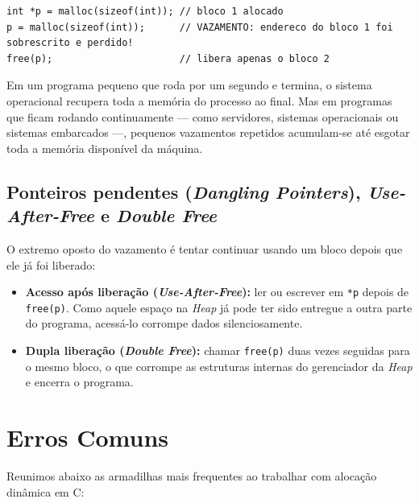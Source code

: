 \begin{lstlisting}
int *p = malloc(sizeof(int)); // bloco 1 alocado
p = malloc(sizeof(int));      // VAZAMENTO: endereco do bloco 1 foi sobrescrito e perdido!
free(p);                      // libera apenas o bloco 2
\end{lstlisting}

Em um programa pequeno que roda por um segundo e termina, o sistema operacional recupera toda a memória do processo ao final. Mas em programas que ficam rodando continuamente — como servidores, sistemas operacionais ou sistemas embarcados —, pequenos vazamentos repetidos acumulam-se até esgotar toda a memória disponível da máquina.

\subsection{Ponteiros pendentes (\textit{Dangling Pointers}), \textit{Use-After-Free} e \textit{Double Free}}

O extremo oposto do vazamento é tentar continuar usando um bloco depois que ele já foi liberado:

\begin{itemize}
    \item \textbf{Acesso após liberação (\textit{Use-After-Free}):} ler ou escrever em \texttt{*p} depois de \texttt{free(p)}. Como aquele espaço na \textit{Heap} já pode ter sido entregue a outra parte do programa, acessá-lo corrompe dados silenciosamente.
    \item \textbf{Dupla liberação (\textit{Double Free}):} chamar \texttt{free(p)} duas vezes seguidas para o mesmo bloco, o que corrompe as estruturas internas do gerenciador da \textit{Heap} e encerra o programa.
\end{itemize}

\section{Erros Comuns}
\label{sec:alocacao-erros-comuns}

Reunimos abaixo as armadilhas mais frequentes ao trabalhar com alocação dinâmica em C:

